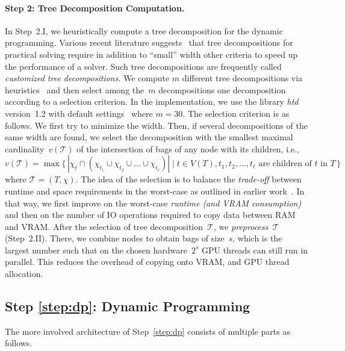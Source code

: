 \documentclass{llncs}
\newcommand{\SB}{\{\,}%
\newcommand{\SM}{\;{|}\;}%
\newcommand{\SE}{\,\}}%
\newcommand{\TTT}{\mathcal{T}}
\newcommand{\Card}[1]{|#1|}
\begin{document}
\paragraph*{Step 2: Tree Decomposition Computation.}
%
In Step~2.I, we heuristically compute a tree decomposition for the
dynamic programming.
%
Various recent literature
suggests~\cite{AbseherMusliuWoltran17b,CharwatWoltran17,JegouNdiayeTerrioux05}
that tree decompositions for practical solving require in addition to
``small'' width other criteria to speed up the performance of a
solver. Such tree decompositions are frequently called
\emph{customized tree decompositions}.
%
We compute $m$ different tree decompositions via
heuristics~\cite{AbseherMusliuWoltran17a} and then select among
the~$m$ decompositions one decomposition according to a selection criterion. In the
implementation, we use the library \emph{htd} version~1.2 with default
settings~\cite{AbseherMusliuWoltran17a} where $m = 30$. The selection
criterion is as follows. We first try to minimize the width. Then, if
several decompositions of the same width are found, we select the
decomposition with the smallest maximal cardinality~$v(\TTT)$ of the
intersection of bags of any node with its children, i.e.,
$v(\TTT)=\max\SB \Card{\chi_t \cap (\chi_{t_1} \cup \chi_{t_2} \cup
  \ldots \cup \chi_{t_\ell}) } \SM t \in V(T), t_1,t_2, \ldots, t_\ell
\text{ are children of } t \text{ in } T \SE$ where
$\TTT =(T, \chi)$.
%
The idea of the selection is to balance the \emph{trade-off} between
runtime and space requirements in the worst-case as outlined in
earlier work~\cite{JegouNdiayeTerrioux05}. In that way, we first
improve on the worst-case \emph{runtime (and VRAM consumption)} and
then on the number of IO operations required to copy data between RAM
and VRAM.
%
%
%
%
%
%
After the selection of tree decomposition~$\mathcal{T}$, we
\emph{preprocess~$\mathcal{T}$} (Step~2.II).  There, we combine nodes to
obtain bags of size~$s$, which is the largest number such that on the
chosen hardware~$2^s$ GPU threads can still run in parallel. This 
reduces the overhead of copying onto VRAM, and GPU
thread allocation.


\subsection*{Step \ref{step:dp}: Dynamic Programming
}
The more involved architecture of Step~\ref{step:dp} %
consists of multiple parts as follows.
%
%
%
%
\end{document}
